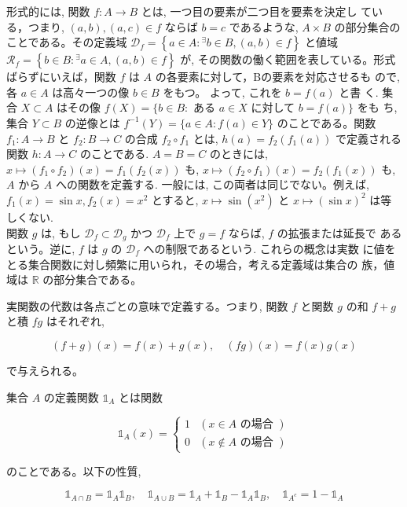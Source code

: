 \documentclass[14pt]{jsarticle}
\begin{document}
形式的には, 関数 $f: A \rightarrow B$ とは, 一つ目の要素が二つ目を要素を決定し ている，つまり, $(a, b),(a, c) \in f$ ならば $b=c$ であるような, $A \times B$ の部分集合のことである。その定義域 $\mathcal{D}_{f}=\left\{a \in A:{ }^{\exists} b \in B,(a, b) \in f\right\}$ と値域 $\mathcal{R}_{f}=\left\{b \in B:{ }^{\exists} a \in A,(a, b) \in f\right\}$ が, その関数の働く範囲を表している。形式ばらずにいえば，関数 $f$ は $A$ の各要素に対して，Bの要素を対応させるも ので, 各 $a \in A$ は高々一つの像 $b \in B$ をもつ。 よって, これを $b=f(a)$ と書 く. 集合 $X \subset A$ はその像 $f(X)=\{b \in B:$ ある $a \in X$ に対して $b=f(a)\}$ をも ち, 集合 $Y \subset B$ の逆像とは $f^{-1}(Y)=\{a \in A: f(a) \in Y\}$ のことである。関数 $f_{1}: A \rightarrow B$ と $f_{2}: B \rightarrow C$ の合成 $f_{2} \circ f_{1}$ とは, $h(a)=f_{2}\left(f_{1}(a)\right)$ で定義される関数 $h: A \rightarrow C$ のことである. $A=B=C$ のときには, $x \mapsto\left(f_{1} \circ f_{2}\right)(x)=f_{1}\left(f_{2}(x)\right)$ も, $x \mapsto\left(f_{2} \circ f_{1}\right)(x)=f_{2}\left(f_{1}(x)\right)$ も, $A$ から $A$ への関数を定義する. 一般には, この両者は同じでない。例えば, $f_{1}(x)=\sin x, f_{2}(x)=x^{2}$ とすると, $x \mapsto \sin \left(x^{2}\right)$ と $x \mapsto(\sin x)^{2}$ は等しくない.\\
関数 $g$ は, もし $\mathcal{D}_{f} \subset \mathcal{D}_{g}$ かつ $\mathcal{D}_{f}$ 上で $g=f$ ならば, $f$ の拡張または延長で あるという。逆に, $f$ は $g$ の $\mathcal{D}_{f}$ への制限であるという. これらの概念は実数 に値をとる集合関数に対し頻繁に用いられ，その場合，考える定義域は集合の 族，値域は $\mathbb{R}$ の部分集合である。

実関数の代数は各点ごとの意味で定義する。つまり, 関数 $f$ と関数 $g$ の和 $f+g$ と積 $f g$ はそれぞれ,

$$
(f+g)(x)=f(x)+g(x), \quad(f g)(x)=f(x) g(x)
$$

で与えられる。

集合 $A$ の定義関数 $\mathbb{1}_{A}$ とは関数

$$
\mathbb{1}_{A}(x)= \begin{cases}1 & (x \in A \text { の場合 }) \\ 0 & (x \notin A \text { の場合 })\end{cases}
$$

のことである。以下の性質,

$$
\mathbb{1}_{A \cap B}=\mathbb{1}_{A} \mathbb{1}_{B}, \quad \mathbb{1}_{A \cup B}=\mathbb{1}_{A}+\mathbb{1}_{B}-\mathbb{1}_{A} \mathbb{1}_{B}, \quad \mathbb{1}_{A^{c}}=1-\mathbb{1}_{A}
$$
\end{document}
